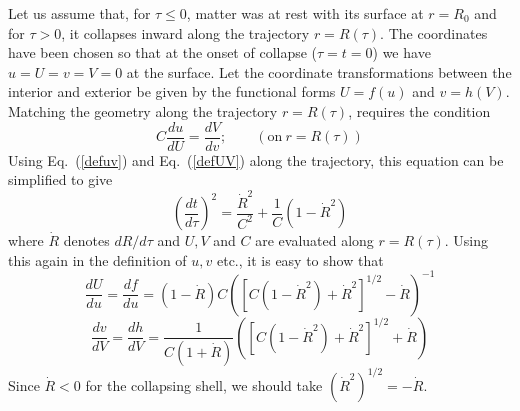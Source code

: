 \documentclass[12pt]{iopart}
\def\eq#1{{Eq.~(\ref{#1})}}
\begin{document}
     Let us assume that, for $\tau\le 0$, matter was at rest with its surface at 
   $r=R_0$ and for $\tau>0$, it collapses inward along the trajectory $r=R(\tau)$. The coordinates
   have been chosen so that at the onset of collapse ($\tau=t=0$) we have $u=U=v=V=0$
   at the surface. Let the  coordinate transformations between the interior and exterior be given by
   the functional forms $U=f(u)$ and $v=h(V)$. Matching the geometry along the trajectory
   $r=R(\tau)$, 
   requires the condition 
   \begin{equation}
    C\frac{du}{dU} =  \frac{dV}{dv}; \qquad (\mathrm{on}\  r=R(\tau)) 
   \end{equation} 
   Using \eq{defuv} and \eq{defUV} along the trajectory, this equation can be 
   simplified to give 
   \begin{equation}
    \left( \frac{dt}{d\tau}\right)^2 = \frac{\dot R^2}{C^2}+ \frac{1}{C} \left( 1 - \dot R^2\right)
   \end{equation} 
   where $\dot R $ denotes $dR/d\tau$ and $U,V$ and $C$ are evaluated along $r=R(\tau)$.
  Using this again in the definition of $u,v$ etc., it is easy to show that
   \begin{equation}
   \frac{dU}{du} = \frac{df}{du} = (1-\dot R)C \left( \left[ C ( 1-\dot R^2) + \dot R^2\right]^{1/2} - \dot R\right)^{-1}
   \label{fofu}
   \end{equation}
   \begin{equation}
  \frac{dv}{dV} = \frac{dh}{dV} = \frac{1}{C(1+\dot R)}\left( \left[ C ( 1-\dot R^2) 
  + \dot R^2\right]^{1/2} + \dot R\right)
  \label{hofv}
   \end{equation}
   Since $\dot R < 0$ for the collapsing shell, we should take
   $(\dot R^2)^{1/2} = - \dot R$.
    
  
  
\end{document}
